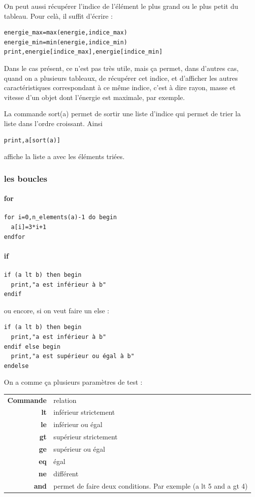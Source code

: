 \documentclass[a4paper,twoside]{article}
\begin{document}
\begin{remarque}
On peut aussi récupérer l'indice de l'élément le plus grand ou le plus petit du tableau. Pour celà, il suffit d'écrire :
\begin{verbatim}
energie_max=max(energie,indice_max)
energie_min=min(energie,indice_min)
print,energie[indice_max],energie[indice_min]
\end{verbatim}

Dans le cas présent, ce n'est pas très utile, mais ça permet, dans d'autres cas, quand on a plusieurs tableaux, de récupérer cet indice, et d'afficher les autres caractéristiques correspondant à ce même indice, c'est à dire rayon, masse et vitesse d'un objet dont l'énergie est maximale, par exemple.
\end{remarque}


\bigskip

La commande sort(a) permet de sortir une liste d'indice qui permet de trier la liste dans l'ordre croissant. Ainsi
\begin{verbatim}
print,a[sort(a)]
\end{verbatim}
affiche la liste a avec les éléments triées.

\subsubsection{les boucles}
\paragraph{for}
\begin{verbatim}
for i=0,n_elements(a)-1 do begin
  a[i]=3*i+1
endfor
\end{verbatim}


\paragraph{if}
\begin{verbatim}
if (a lt b) then begin
  print,"a est inférieur à b"
endif
\end{verbatim}

ou encore, si on veut faire un else :
\begin{verbatim}
if (a lt b) then begin
  print,"a est inférieur à b"
endif else begin
  print,"a est supérieur ou égal à b"
endelse
\end{verbatim}

On a comme ça plusieurs paramètres de test :

\begin{tabular}{>{\bfseries}r<{}@{ : }p{11cm}}
Commande &	relation\\
lt & inférieur strictement\\
le & inférieur ou égal\\
gt & supérieur strictement\\
ge & supérieur ou égal\\
eq & égal\\
ne & différent\\
and & permet de faire deux conditions. Par exemple (a lt 5 and a gt 4)
\end{tabular}
\end{document}
